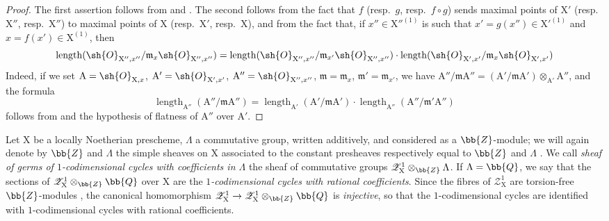 \begin{proof}
The first assertion follows from  and .
The second follows from the fact that $f$ (resp.\ $g$, resp.\ $f\circ g$) sends maximal points of $\mathrm{X}'$ (resp.\ $\mathrm{X}''$, resp.\ $\mathrm{X}''$) to maximal points of $\mathrm{X}$ (resp.\ $\mathrm{X}'$, resp.\ $\mathrm{X}$), and from the fact that, if $x''\in\mathrm{X}''^{(1)}$ is such that $x'=g(x'')\in\mathrm{X}'^{(1)}$ and $x=f(x')\in\mathrm{X}^{(1)}$, then
\[
  \operatorname{length}(\sh{O}_{\mathrm{X}'',x''}/\mathfrak{m}_x\sh{O}_{\mathrm{X}'',x''})=\operatorname{length}(\sh{O}_{\mathrm{X}'',x''}/\mathfrak{m}_{x'}\sh{O}_{\mathrm{X}'',x''})\cdot\operatorname{length}(\sh{O}_{\mathrm{X}',x'}/\mathfrak{m}_x\sh{O}_{\mathrm{X}',x'})
\]
Indeed, if we set $\mathrm{A}=\sh{O}_{\mathrm{X},x}$, $\mathrm{A}'=\sh{O}_{\mathrm{X}',x'}$, $\mathrm{A}''=\sh{O}_{\mathrm{X}'',x''}$, $\mathfrak{m}=\mathfrak{m}_x$, $\mathfrak{m}'=\mathfrak{m}_{x'}$, we have $\mathrm{A}''/\mathfrak{m}\mathrm{A}''=(\mathrm{A}'/\mathfrak{m}\mathrm{A}')\otimes_{\mathrm{A}'}\mathrm{A}''$, and the formula
\[
  \operatorname{length}_{\mathrm{A}''}(\mathrm{A}''/\mathfrak{m}\mathrm{A}'')=\operatorname{length}_{\mathrm{A}'}(\mathrm{A}'/\mathfrak{m}\mathrm{A}')\cdot\operatorname{length}_{\mathrm{A}''}(\mathrm{A}''/\mathfrak{m}'\mathrm{A}'')
\]
follows from  and the hypothesis of flatness of $\mathrm{A}''$ over $\mathrm{A}'$.
\end{proof}

\begin{env}[21.10.9]
\label{IV.21.10.9}
Let $\mathrm{X}$ be a locally Noetherian prescheme, $\Lambda$ a commutative group, written additively, and considered as a $\bb{Z}$-module; we will again denote by $\bb{Z}$ and $\Lambda$ the simple sheaves on $\mathrm{X}$ associated to the constant presheaves respectively equal to $\bb{Z}$ and $\Lambda$ .
We call \emph{sheaf of germs of $1$-codimensional cycles with coefficients in $\Lambda$} the sheaf of commutative groups $\mathscr{Z}^1_{\mathrm{X}}\otimes_{\bb{Z}}\Lambda$.
If $\Lambda=\bb{Q}$, we say that the sections
of $\mathscr{Z}^1_{\mathrm{X}}\otimes_{\bb{Z}}\bb{Q}$ over $\mathrm{X}$ are the \emph{$1$-codimensional cycles with rational coefficients}.
Since the fibres of $\mathscr{Z}^1_{\mathrm{X}}$ are torsion-free $\bb{Z}$-modules , the canonical homomorphism $\mathscr{Z}^1_{\mathrm{X}}\to\mathscr{Z}^1_{\mathrm{X}}\otimes_{\bb{Z}}\bb{Q}$ is \emph{injective}, so that the $1$-codimensional cycles are identified with $1$-codimensional cycles with rational coefficients.
\end{env}

